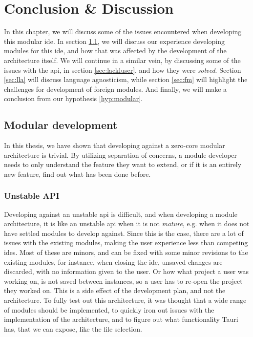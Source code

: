 \chapter{Conclusion \& Discussion} \label{cha:conclusion}

In this chapter, we will discuss some of the issues encountered when developing
this modular \gls*{ide}. In section \ref{sec:mod-dev}, we will discuss our
experience developing modules for this \gls*{ide}, and how that was affected by
the development of the architecture itself. We will continue in a similar vein,
by discussing some of the issues with the \gls*{api}, in section
\ref{sec:lackluser}, and how they were \textit{solved}. Section \ref{sec:lla}
will discuss language agnosticism, while section \ref{sec:fm} will highlight the
challenges for development of foreign modules. And finally, we will make a
conclusion from our hypothesis \ref{hyp:modular}.


\section{Modular development} \label{sec:mod-dev}

In this thesis, we have shown that developing against a zero-core modular
architecture is trivial. By utilizing separation of concerns, a module developer
needs to only understand the feature they want to extend, or if it is an
entirely new feature, find out what has been done before.


\subsection{Unstable API}

Developing against an unstable \gls*{api} is difficult, and when developing a
module architecture, it is like an unstable \gls*{api} when it is not
\textit{mature}, e.g. when it does not have settled modules to develop against.
Since this is the case, there are a lot of issues with the existing modules,
making the user experience less than competing \gls*{ide}s. Most of these are
minors, and can be fixed with some minor revisions to the existing modules, for
instance, when closing the \gls*{ide}, unsaved changes are discarded, with no
information given to the user. Or how what project a user was working on, is not
saved between instances, so a user has to re-open the project they worked on.
This is a side effect of the development plan, and not the architecture. To
fully test out this architecture, it was thought that a wide range of modules
should be implemented, to quickly iron out issues with the implementation of the
architecture, and to figure out what functionality Tauri has, that we can
expose, like the file selection.

